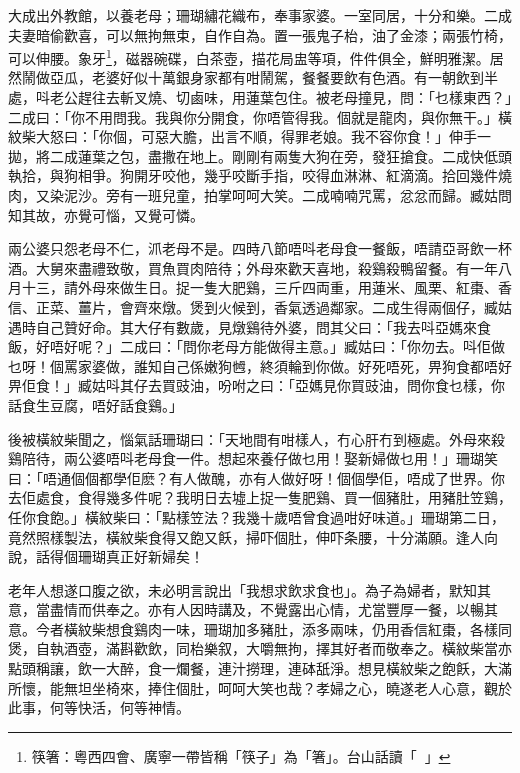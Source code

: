 \documentclass[a5paper, 12pt, openany]{book} %
\begin{document}
	大成出外教館，以養老母；珊瑚繡花織布，奉事家婆。一室同居，十分和樂。二成夫妻暗偷歡喜，可以無拘無束，自作自為。置一張鬼子枱，油了金漆；兩張竹椅，可以伸腰。象牙\footnote{筷箸：粵西四會、廣寧一帶皆稱「筷子」為「箸」。台山話讀「󰜚󱂤」}，磁器碗碟，白茶壺，描花局盅等項，件件俱全，鮮明雅潔。居然鬧做亞瓜，老婆好似十萬銀身家都有咁鬧駕，餐餐要飲有色酒。有一朝飲到半處，呌老公趕往去斬叉燒、切鹵味，用蓮葉包住。被老母撞見，問：「乜樣東西？」二成曰：「你不用問我。我與你分開食，你唔管得我。個就是龍肉，與你無干。」橫紋柴大怒曰：「你個，可惡大膽，出言不順，得罪老娘。我不容你食！」伸手一拋，將二成蓮葉之包，盡撒在地上。剛剛有兩隻大狗在旁，發狂搶食。二成快低頭執拾，與狗相爭。狗開牙咬他，幾乎咬斷手指，咬得血淋淋、紅滴滴。拾回幾件燒肉，又染泥沙。旁有一班兒童，拍掌呵呵大笑。二成喃喃咒罵，忿忿而歸。臧姑問知其故，亦覺可惱，又覺可憐。

	兩公婆只怨老母不仁，沠老母不是。四時八節唔呌老母食一餐飯，唔請亞哥飲一杯酒。大舅來盡禮致敬，買魚買肉陪待；外母來歡天喜地，殺鷄殺鴨留餐。有一年八月十三，請外母來做生日。捉一隻大肥鷄，三斤四両重，用蓮米、風栗、紅棗、香信、正菜、薑片，會齊來燉。煲到火候到，香氣透過鄰家。二成生得兩個仔，臧姑遇時自己贊好命。其大仔有數歲，見燉鷄待外婆，問其父曰：「我去呌亞媽來食飯，好唔好呢？」二成曰：「問你老母方能做得主意。」臧姑曰：「你勿去。呌佢做乜呀！個罵家婆做，誰知自己係嫩狗乸，終須輪到你做。好死唔死，畀狗食都唔好畀佢食！」臧姑呌其仔去買豉油，吩咐之曰：「亞媽見你買豉油，問你食乜樣，你話食生豆腐，唔好話食鷄。」

	後被橫紋柴聞之，惱氣話珊瑚曰：「天地間有咁樣人，冇心肝冇到極處。外母來殺鷄陪待，兩公婆唔呌老母食一件。想起來養仔做乜用！娶新婦做乜用！」珊瑚笑曰：「唔通個個都學佢麽？有人做醜，亦有人做好呀！個個學佢，唔成了世界。你去佢處食，食得幾多件呢？我明日去墟上捉一隻肥鷄、買一個豬肚，用豬肚笠鷄，任你食飽。」橫紋柴曰：「點樣笠法？我幾十歲唔曾食過咁好味道。」珊瑚第二日，竟然照樣製法，橫紋柴食得又飽又飫，掃吓個肚，伸吓条腰，十分滿願。逢人向說，話得個珊瑚真正好新婦矣！

	老年人想遂口腹之欲，未必明言說出「我想求飲求食也」。為子為婦者，默知其意，當盡情而供奉之。亦有人因時講及，不覺露出心情，尤當豐厚一餐，以暢其意。今者橫紋柴想食鷄肉一味，珊瑚加多豬肚，添多兩味，仍用香信紅棗，各樣同煲，自執酒壺，滿斟歡飲，同枱樂叙，大嚼無拘，擇其好者而敬奉之。橫紋柴當亦點頭稱讓，飲一大醉，食一爛餐，連汁撈理，連砵舐淨。想見橫紋柴之飽飫，大滿所懷，能無坦坐椅來，捧住個肚，呵呵大笑也哉？孝婦之心，曉遂老人心意，觀於此事，何等快活，何等神情。
\end{document}
